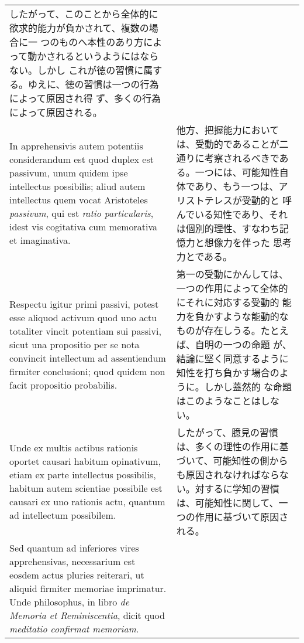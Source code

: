 \documentclass[10pt]{jsarticle} %
\begin{document}
\begin{longtable}{p{21em}p{21em}}
したがって、このことから全体的に欲求的能力が負かされて、複数の場合に一
つのものへ本性のあり方によって動かされるというようにはならない。しかし
これが徳の習慣に属する。ゆえに、徳の習慣は一つの行為によって原因され得
ず、多くの行為によって原因される。

\\

In apprehensivis autem potentiis considerandum est quod duplex est
passivum, unum quidem ipse intellectus possibilis; aliud autem
intellectus quem vocat Aristoteles {\itshape passivum}, qui est
{\itshape ratio particularis}, idest vis cogitativa cum memorativa et
imaginativa.


&

他方、把握能力においては、受動的であることが二通りに考察されるべきであ
る。一つには、可能知性自体であり、もう一つは、アリストテレスが受動的と
呼んでいる知性であり、それは個別的理性、すなわち記憶力と想像力を伴った
思考力とである。

\\

Respectu igitur primi passivi, potest esse aliquod activum quod uno
actu totaliter vincit potentiam sui passivi, sicut una propositio per
se nota convincit intellectum ad assentiendum firmiter conclusioni;
quod quidem non facit propositio probabilis.


&

第一の受動にかんしては、一つの作用によって全体的にそれに対応する受動的
能力を負かすような能動的なものが存在しうる。たとえば、自明の一つの命題
が、結論に堅く同意するように知性を打ち負かす場合のように。しかし蓋然的
な命題はこのようなことはしない。



\\

Unde ex multis actibus rationis oportet causari habitum opinativum,
etiam ex parte intellectus possibilis, habitum autem scientiae
possibile est causari ex uno rationis actu, quantum ad intellectum
possibilem.


&

したがって、臆見の習慣は、多くの理性の作用に基づいて、可能知性の側から
も原因されなければならない。対するに学知の習慣は、可能知性に関して、一
つの作用に基づいて原因される。

\\

Sed quantum ad inferiores vires apprehensivas, necessarium est eosdem
actus pluries reiterari, ut aliquid firmiter memoriae imprimatur.
Unde philosophus, in libro {\itshape de Memoria et Reminiscentia},
dicit quod {\itshape meditatio confirmat memoriam}.


\end{longtable}
\end{document}

